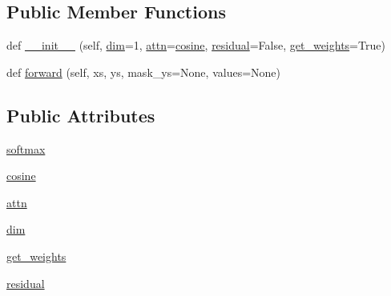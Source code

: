 \subsection*{Public Member Functions}
\begin{DoxyCompactItemize}
\item 
def \hyperlink{classparlai_1_1agents_1_1transformer_1_1modules_1_1BasicAttention_afa25129ca6ce9851053205f44f090fd6}{\+\_\+\+\_\+init\+\_\+\+\_\+} (self, \hyperlink{classparlai_1_1agents_1_1transformer_1_1modules_1_1BasicAttention_ad0beb8f8b3e4514139b08555cf739d55}{dim}=1, \hyperlink{classparlai_1_1agents_1_1transformer_1_1modules_1_1BasicAttention_a04d74d5efbfdf47d36aff30331775368}{attn}=\textquotesingle{}\hyperlink{classparlai_1_1agents_1_1transformer_1_1modules_1_1BasicAttention_abed26e42fa2293f14cbbcf51c090794c}{cosine}\textquotesingle{}, \hyperlink{classparlai_1_1agents_1_1transformer_1_1modules_1_1BasicAttention_a98c0f263db25cf305c333e04f8a0843d}{residual}=False, \hyperlink{classparlai_1_1agents_1_1transformer_1_1modules_1_1BasicAttention_a98d54b38fac0a88d46eba7adf6ac542c}{get\+\_\+weights}=True)
\item 
def \hyperlink{classparlai_1_1agents_1_1transformer_1_1modules_1_1BasicAttention_adb18b6c2564672c1820b3c72583dc0c0}{forward} (self, xs, ys, mask\+\_\+ys=None, values=None)
\end{DoxyCompactItemize}
\subsection*{Public Attributes}
\begin{DoxyCompactItemize}
\item 
\hyperlink{classparlai_1_1agents_1_1transformer_1_1modules_1_1BasicAttention_a669fa3f4cd988703371fc127a4943f07}{softmax}
\item 
\hyperlink{classparlai_1_1agents_1_1transformer_1_1modules_1_1BasicAttention_abed26e42fa2293f14cbbcf51c090794c}{cosine}
\item 
\hyperlink{classparlai_1_1agents_1_1transformer_1_1modules_1_1BasicAttention_a04d74d5efbfdf47d36aff30331775368}{attn}
\item 
\hyperlink{classparlai_1_1agents_1_1transformer_1_1modules_1_1BasicAttention_ad0beb8f8b3e4514139b08555cf739d55}{dim}
\item 
\hyperlink{classparlai_1_1agents_1_1transformer_1_1modules_1_1BasicAttention_a98d54b38fac0a88d46eba7adf6ac542c}{get\+\_\+weights}
\item 
\hyperlink{classparlai_1_1agents_1_1transformer_1_1modules_1_1BasicAttention_a98c0f263db25cf305c333e04f8a0843d}{residual}
\end{DoxyCompactItemize}


